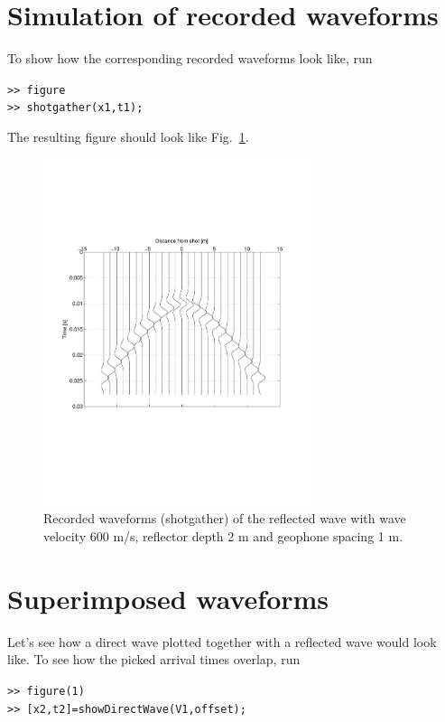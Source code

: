 \documentclass[11pt]{article}
\begin{document}
\section{Simulation of recorded waveforms}

To show how the corresponding recorded waveforms look like, run

\verb#>> figure#\\
\verb#>> shotgather(x1,t1);#

The resulting figure should look like Fig.~\ref{reflectwave}.

\begin{figure}
  \centering
  \includegraphics[width=0.7\textwidth, trim = 1cm 7.5cm 2cm
    6cm,clip]{figures/ReflectedWave.pdf}
  \caption{\label{reflectwave} Recorded waveforms (shotgather) of the
    reflected wave with wave velocity 600 m/s, reflector depth 2 m and
    geophone spacing 1 m.}
\end{figure}

\section{Superimposed waveforms}

Let's see how a direct wave plotted together with a reflected wave
would look like. To see how the picked arrival times overlap, run

\verb#>> figure(1)#\\
\verb#>> [x2,t2]=showDirectWave(V1,offset);#
\end{document}
